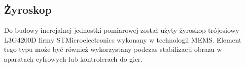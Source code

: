 \subsection{Żyroskop}
Do budowy inercjalnej jednostki pomiarowej został użyty żyroskop trójosiowy L3G4200D firmy STMicroelectronics wykonany w
technologii MEMS. Element tego typu może być również wykorzystany podczas stabilizacji obrazu w aparatach cyfrowych lub
kontrolerach do gier.